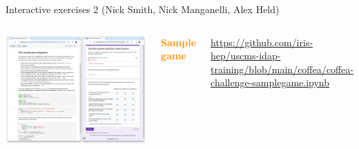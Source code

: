 \documentclass[aspectratio=169]{beamer}
\begin{document}
\begin{frame}{Interactive exercises 2 (Nick Smith, Nick Manganelli, Alex Held)}
\vspace{0.25 cm}
\large
\begin{columns}
\includegraphics[width=\linewidth]{PLOTS/sample-guessing-game.png}

\textcolor{darkorange}{\bf Sample game}

\tiny
\vspace{0.2 cm}
\textcolor{blue}{\href{https://github.com/iris-hep/uscms-idap-training/blob/main/coffea/coffea-challenge-samplegame.ipynb}{https://github.com/iris-hep/uscms-idap-training/blob/main/coffea/coffea-challenge-samplegame.ipynb}}

\small
\vspace{0.225 cm}

\vspace{0.225 cm}

\vspace{0.225 cm}

\vspace{0.225 cm}
\end{columns}
\end{frame}
\end{document}
